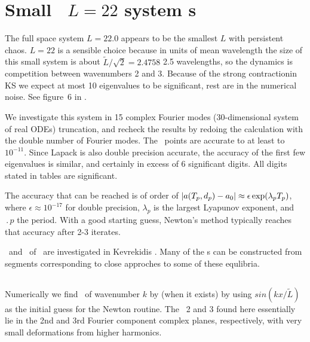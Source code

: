 %


\section{Small \KS\ $L=22$ system {\rpo s}}

The full space \KS system $L = 22.0$ 
appears to be the smallest $L$ with persistent chaos.  
$L=22$ is a sensible choice because in units of mean wavelength
the size of this small system is about $ \tilde{L}/\sqrt{2}= 2.4758$
2.5 wavelengths, 
so the dynamics is competition between wavenumbers
2 and 3.
Because of the strong contractionin KS we expect at most 10 eigenvalues to be
significant, rest are in the numerical noise. See figure~6 in
.

We investigate this system in 15 complex Fourier modes
(30-dimensional system of real ODEs) truncation, and recheck the results 
by redoing the calculation with the double number of Fourier modes.
The \eqv\ points are accurate to at least to $10^{-11}$. Since
Lapack is also double precision accurate, the accuracy of the first
few eigenvalues is similar, and certainly in
excess of 6 significant digits.
%
All digits stated in tables are significant.

The accuracy that can be reached is of order of
$|a({T_{p}},d_p) - a_0| \approx \epsilon \exp(\lambda_p {T_{p}})$,
where $\epsilon \approx 10^{-17}$ for double precision,
$\lambda_p$ is the largest Lyapunov exponent, 
and $\period{p}$ the period.  With a good starting guess,
Newton's method
typically reaches that accuracy after 2-3 iterates.


\Eqva\ and \reqva\ of \KSe\ are investigated in Kevrekidis \etal{}. 
Many of the \rpo s can be constructed from segments corresponding to
close approches to some of these equlibria.

\subsection{\Eqva}

Numerically we find \eqva\ of wavenumber $k$ by (when it exists)
by using $sin( k x /\tilde{L})$ as the initial guess for the Newton routine.
The \eqva\ {\nameit}2 and {\nameit}3 found here
essentially lie in the 2nd and 3rd Fourier component complex planes,
respectively, with very
small deformations from higher harmonics.

